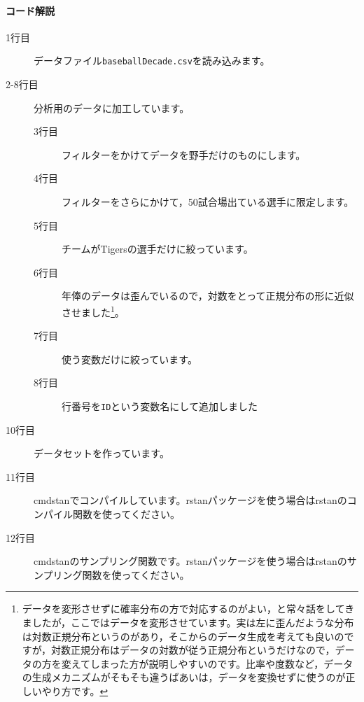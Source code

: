\documentclass{ltjsbook}
\begin{document}
\paragraph{コード解説}
    \begin{description}
        \item[1行目] データファイル\verb|baseballDecade.csv|を読み込みます。
        \item[2-8行目] 分析用のデータに加工しています。
            \begin{description} 
                \item[3行目] フィルターをかけてデータを野手だけのものにします。
                \item[4行目] フィルターをさらにかけて，50試合場出ている選手に限定します。
                \item[5行目] チームがTigersの選手だけに絞っています。
                \item[6行目] 年俸のデータは歪んでいるので，対数をとって正規分布の形に近似させました\footnote{データを変形させずに確率分布の方で対応するのがよい，と常々話をしてきましたが，ここではデータを変形させています。実は左に歪んだような分布は対数正規分布というのがあり，そこからのデータ生成を考えても良いのですが，対数正規分布はデータの対数が従う正規分布というだけなので，データの方を変えてしまった方が説明しやすいのです。比率や度数など，データの生成メカニズムがそもそも違うばあいは，データを変換せずに使うのが正しいやり方です。}。
                \item[7行目] 使う変数だけに絞っています。
                \item[8行目] 行番号を\verb|ID|という変数名にして追加しました
            \end{description}
        \item[10行目] データセットを作っています。
        \item[11行目] cmdstanでコンパイルしています。rstanパッケージを使う場合はrstanのコンパイル関数を使ってください。
        \item[12行目] cmdstanのサンプリング関数です。rstanパッケージを使う場合はrstanのサンプリング関数を使ってください。
    \end{description} 
\end{document}
